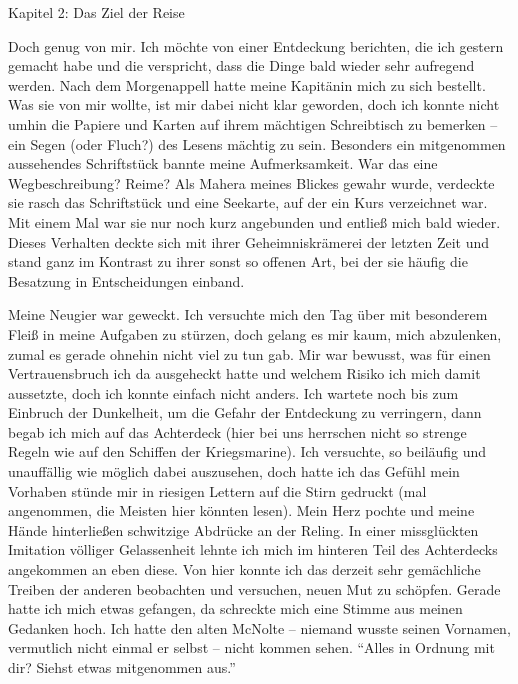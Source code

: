 \vspace{0.5cm}\noindent

{\label{1Kapitel 2: Das Ziel der Reise}\vspace{0.5cm}\noindent\LARGE Kapitel 2: Das Ziel der Reise}
\renewcommand{\storychapter}{Kapitel 2: Das Ziel der Reise}

\vspace{0.5cm}\noindent
Doch genug von mir. Ich möchte von einer Entdeckung berichten, die ich gestern gemacht habe und die verspricht, dass die Dinge bald wieder sehr aufregend werden. Nach dem Morgenappell hatte meine Kapitänin mich zu sich bestellt. Was sie von mir wollte, ist mir dabei nicht klar geworden, doch ich konnte nicht umhin die Papiere und Karten auf ihrem mächtigen Schreibtisch zu bemerken -- ein Segen (oder Fluch?) des Lesens mächtig zu sein. Besonders ein mitgenommen aussehendes Schriftstück bannte meine Aufmerksamkeit. War das eine Wegbeschreibung? Reime? Als Mahera meines Blickes gewahr wurde, verdeckte sie rasch das Schriftstück und eine Seekarte, auf der ein Kurs verzeichnet war. Mit einem Mal war sie nur noch kurz angebunden und entließ mich bald wieder. Dieses Verhalten deckte sich mit ihrer Geheimniskrämerei der letzten Zeit und stand ganz im Kontrast zu ihrer sonst so offenen Art, bei der sie häufig die Besatzung in Entscheidungen einband.

Meine Neugier war geweckt. Ich versuchte mich den Tag über mit besonderem Fleiß in meine Aufgaben zu stürzen, doch gelang es mir kaum, mich abzulenken, zumal es gerade ohnehin nicht viel zu tun gab. Mir war bewusst, was für einen Vertrauensbruch ich da ausgeheckt hatte und welchem Risiko ich mich damit aussetzte, doch ich konnte einfach nicht anders. Ich wartete noch bis zum Einbruch der Dunkelheit, um die Gefahr der Entdeckung zu verringern, dann begab ich mich auf das Achterdeck (hier bei uns herrschen nicht so strenge Regeln wie auf den Schiffen der Kriegsmarine). Ich versuchte, so beiläufig und unauffällig wie möglich dabei auszusehen, doch hatte ich das Gefühl mein Vorhaben stünde mir in riesigen Lettern auf die Stirn gedruckt (mal angenommen, die Meisten hier könnten lesen). Mein Herz pochte und meine Hände hinterließen schwitzige Abdrücke an der Reling. In einer missglückten Imitation völliger Gelassenheit lehnte ich mich im hinteren Teil des Achterdecks angekommen an eben diese. Von hier konnte ich das derzeit sehr gemächliche Treiben der anderen beobachten und versuchen, neuen Mut zu schöpfen. Gerade hatte ich mich etwas gefangen, da schreckte mich eine Stimme aus meinen Gedanken hoch. Ich hatte den alten McNolte -- niemand wusste seinen Vornamen, vermutlich nicht einmal er selbst -- nicht kommen sehen. \enquote{Alles in Ordnung mit dir? Siehst etwas mitgenommen aus.}

